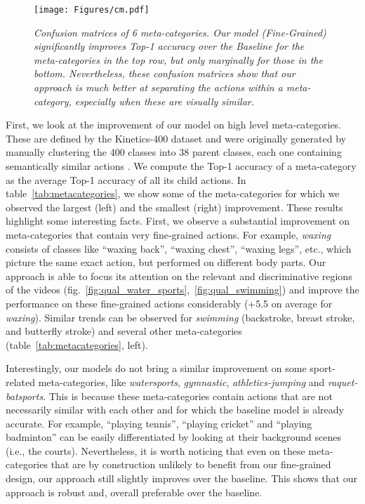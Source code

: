 \documentclass[10pt,twocolumn,letterpaper]{article}
\begin{document}
\begin{figure*}[t]
    \begin{center}
    \texttt{[image: Figures/cm.pdf]}
    \end{center}
    \vspace{-3mm}
    \caption{\it \small Confusion matrices of 6 meta-categories. Our model (Fine-Grained) significantly improves Top-1 accuracy over the Baseline for the meta-categories in the top row, but only marginally for those in the bottom. Nevertheless, these confusion matrices show that our approach is much better at separating the actions within a meta-category, especially when these are visually similar. \vspace{-3mm}}
    \label{fig:cm}
\end{figure*}

First, we look at the improvement of our model on high level meta-categories. These are defined by the Kinetics-400 dataset and were originally generated by manually clustering the 400 classes into 38 parent classes, each one containing semantically similar actions \cite{Kinetics}. We compute the Top-1 accuracy of a meta-category as the average Top-1 accuracy of all its child actions. In table~\ref{tab:metacategories}, we show some of the meta-categories for which we observed the largest (left) and the smallest (right) improvement. These results highlight some interesting facts. First, we observe a substantial improvement on meta-categories that contain very fine-grained actions. For example, {\it waxing} consists of classes like ``waxing back'', ``waxing chest'', ``waxing legs'', etc., which picture the same exact action, but performed on different body parts. Our approach is able to focus its attention on the relevant and discriminative regions of the videos (fig.~\ref{fig:qual_water_sports},~\ref{fig:qual_swimming}) and improve the performance on these fine-grained actions considerably (+5.5 on average for {\it waxing}). Similar trends can be observed for {\it swimming} (backstroke, breast stroke, and butterfly stroke) and several other meta-categories (table~\ref{tab:metacategories}, left). 

Interestingly, our models do not bring a similar improvement on some sport-related meta-categories, like {\it watersports}, {\it gymnastic}, {\it athletics-jumping} and {\it raquet-batsports}. This is because these meta-categories contain actions that are not necessarily similar with each other and for which the baseline model is already accurate. For example, ``playing tennis'', ``playing cricket'' and ``playing badminton'' can be easily differentiated by looking at their background scenes (i.e., the courts). Nevertheless, it is worth noticing that even on these meta-categories that are by construction unlikely to benefit from our fine-grained design, our approach still slightly improves over the baseline. This shows that our approach is robust and, overall preferable over the baseline.
\end{document}
